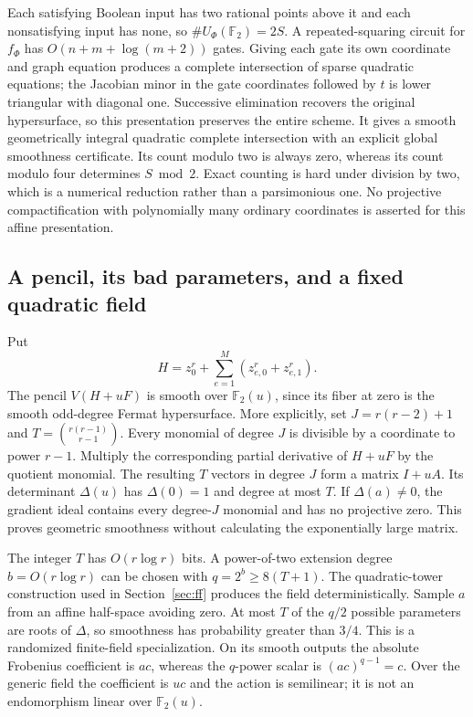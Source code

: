 Each satisfying Boolean input has two rational points above it and each nonsatisfying input has none, so $\#U_\Phi(\mathbb F_2)=2S$. A repeated-squaring circuit for $f_\Phi$ has $O(n+m+\log(m+2))$ gates. Giving each gate its own coordinate and graph equation produces a complete intersection of sparse quadratic equations; the Jacobian minor in the gate coordinates followed by $t$ is lower triangular with diagonal one. Successive elimination recovers the original hypersurface, so this presentation preserves the entire scheme. It gives a smooth geometrically integral quadratic complete intersection with an explicit global smoothness certificate. Its count modulo two is always zero, whereas its count modulo four determines $S\bmod2$. Exact counting is hard under division by two, which is a numerical reduction rather than a parsimonious one. No projective compactification with polynomially many ordinary coordinates is asserted for this affine presentation.

\subsection{A pencil, its bad parameters, and a fixed quadratic field}
Put
\[
 H=z_0^r+\sum_{e=1}^{M}(z_{e,0}^r+z_{e,1}^r).
\]
The pencil $V(H+uF)$ is smooth over $\mathbb F_2(u)$, since its fiber at zero is the smooth odd-degree Fermat hypersurface. More explicitly, set $J=r(r-2)+1$ and $T=\binom{r(r-1)}{r-1}$. Every monomial of degree $J$ is divisible by a coordinate to power $r-1$. Multiply the corresponding partial derivative of $H+uF$ by the quotient monomial. The resulting $T$ vectors in degree $J$ form a matrix $I+uA$. Its determinant $\Delta(u)$ has $\Delta(0)=1$ and degree at most $T$. If $\Delta(a)\ne0$, the gradient ideal contains every degree-$J$ monomial and has no projective zero. This proves geometric smoothness without calculating the exponentially large matrix.

The integer $T$ has $O(r\log r)$ bits. A power-of-two extension degree $b=O(r\log r)$ can be chosen with $q=2^b\geq8(T+1)$. The quadratic-tower construction used in Section~\ref{sec:ff} produces the field deterministically. Sample $a$ from an affine half-space avoiding zero. At most $T$ of the $q/2$ possible parameters are roots of $\Delta$, so smoothness has probability greater than $3/4$. This is a randomized finite-field specialization. On its smooth outputs the absolute Frobenius coefficient is $ac$, whereas the $q$-power scalar is $(ac)^{q-1}=c$. Over the generic field the coefficient is $uc$ and the action is semilinear; it is not an endomorphism linear over $\mathbb F_2(u)$.

